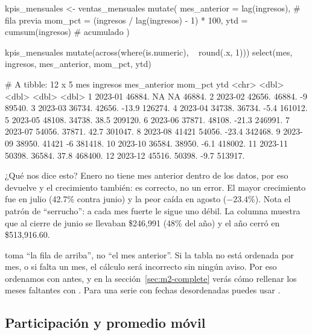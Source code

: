 \begin{rcode}
kpis_mensuales <- ventas_mensuales %
  mutate(
    mes_anterior = lag(ingresos),                    # fila previa
    mom_pct      = (ingresos / lag(ingresos) - 1) * 100,
    ytd          = cumsum(ingresos)                  # acumulado
  )

kpis_mensuales %
  mutate(across(where(is.numeric), ~ round(.x, 1))) %
  select(mes, ingresos, mes_anterior, mom_pct, ytd)
\end{rcode}
\begin{rsalida}
# A tibble: 12 x 5
   mes     ingresos mes_anterior mom_pct     ytd
   <chr>      <dbl>        <dbl>   <dbl>   <dbl>
 1 2023-01   46884.          NA     NA    46884.
 2 2023-02   42656.       46884.    -9    89540.
 3 2023-03   36734.       42656.   -13.9 126274.
 4 2023-04   34738.       36734.    -5.4 161012.
 5 2023-05   48108.       34738.    38.5 209120.
 6 2023-06   37871.       48108.   -21.3 246991.
 7 2023-07   54056.       37871.    42.7 301047.
 8 2023-08   41421        54056.   -23.4 342468.
 9 2023-09   38950.       41421     -6   381418.
10 2023-10   36584.       38950.    -6.1 418002.
11 2023-11   50398.       36584.    37.8 468400.
12 2023-12   45516.       50398.    -9.7 513917.
\end{rsalida}

¿Qué nos dice esto? Enero no tiene mes anterior dentro de los datos, por eso
 devuelve  y el crecimiento también: es correcto,
no un error. El mayor crecimiento fue en julio (42.7\% contra junio) y la
peor caída en agosto ($-23.4$\%). Nota el patrón de ``serrucho'': a cada
mes fuerte le sigue uno débil. La columna  muestra que al cierre
de junio se llevaban \$246,991 (48\% del año) y el año cerró en
\$513,916.60.

\begin{advertencia}
 toma ``la fila de arriba'', no ``el mes anterior''. Si la
tabla no está ordenada por mes, o si falta un mes, el cálculo será
incorrecto sin ningún aviso. Por eso ordenamos con 
antes, y en la sección~\ref{sec:m2-complete} verás cómo rellenar los meses
faltantes con . Para una serie con fechas desordenadas
puedes usar .
\end{advertencia}

\subsection{Participación y promedio móvil}

